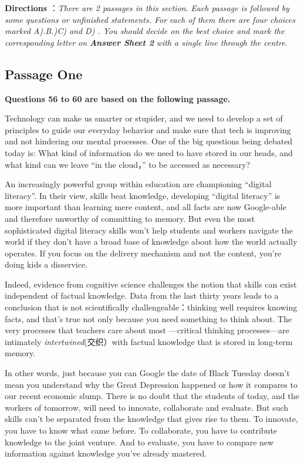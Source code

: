 \documentclass[UTF8,11pt]{ctexart}
\begin{document}
\textbf{Directions} ：\textit{There are 2 passages in this section}.\textit{ Each passage is followed by some questions or unfinished statements. For} \textit{each of them there are four choices marked A).B.)C) and D) . You should decide on the best choice and mark the} \textit{corresponding letter on}\textbf{\textit{ Answer Sheet 2}}\textit{ with a single line through the centre.}


\subsection*{\textbf{Passage One}}


\textbf{Questions 56 to 60 are based on the following passage.}


Technology can make us smarter or stupider, and we need to develop a set of principles to guide our everyday behavior and make sure that tech is improving and not hindering our mental processes. One of the big questions being debated today is: What kind of information do we need to have stored in our heads, and what kind can we leave “in the cloud，” to be accessed as necessary?


An increasingly powerful group within education are championing “digital literacy”. In their view, skills beat knowledge, developing “digital literacy” is more important than learning mere content, and all facts are now Google-able and therefore unworthy of committing to memory. But even the most sophisticated digital literacy skills won’t help students and workers navigate the world if they don’t have a broad base of knowledge about how the world actually operates. If you focus on the delivery mechanism and not the content, you’re doing kids a disservice.


Indeed, evidence from cognitive science challenges the notion that skills can exist independent of factual knowledge. Data from the last thirty years leads to a conclusion that is not scientifically challengeable：thinking well requires knowing facts, and that’s true not only because you need something to think about. The very processes that teachers care about most —critical thinking processes—are intimately\textit{ intertwined}(交织）with factual knowledge that is stored in long-term memory.


In other words, just because you can Google the date of Black Tuesday doesn’t mean you understand why the Great Depression happened or how it compares to our recent economic slump. There is no doubt that the students of today, and the workers of tomorrow, will need to innovate, collaborate and evaluate. But such skills can’t be separated from the knowledge that gives rise to them. To innovate, you have to know what came before. To collaborate, you have to contribute knowledge to the joint venture. And to evaluate, you have to compare new information against knowledge you’ve already mastered.
\end{document}
